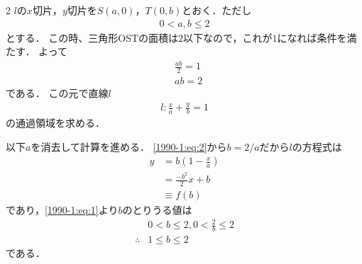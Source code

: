 \documentclass[../../../../main.tex]{subfiles}
\begin{document}
\begin{multicols}{2}
    $l$の$x$切片，$y$切片を$S(a,0)$，$T(0,b)$とおく．ただし
    \begin{align}
        0<a,b \le 2 \label{1990-1:eq:1}
    \end{align}
    とする．
    この時、三角形OSTの面積は$2$以下なので，これが$1$になれば条件を満たす．
    よって
    \begin{align}
         & \frac{ab}{2} = 1         \\
         & ab=2 \label{1990-1:eq:2}
    \end{align}
    である．
    この元で直線$l$
    \begin{align*}
        l: \frac{x}{a}+\frac{y}{b}=1
    \end{align*}
    の通過領域を求める．

    以下$a$を消去して計算を進める．
    \cref{1990-1:eq:2}から$b=2/a$だから$l$の方程式は
    \begin{align}
        y
         & = b\left(1-\frac{x}{a}\right)              \\
         & = \frac{-b^2}{2}x + b  \label{1990-1:eq:3} \\
         & \equiv f(b)
    \end{align}
    であり，\cref{1990-1:eq:1}より$b$のとりうる値は
    \begin{align}
         & 0<b \le 2, 0<\frac{2}{b} \le 2    \\
        \therefore
         & 1 \le b \le 2 \label{1990-1:eq:4}
    \end{align}
    である．

    \begin{figure}[H]
        \centering
\end{figure}
\end{multicols}
\end{document}
